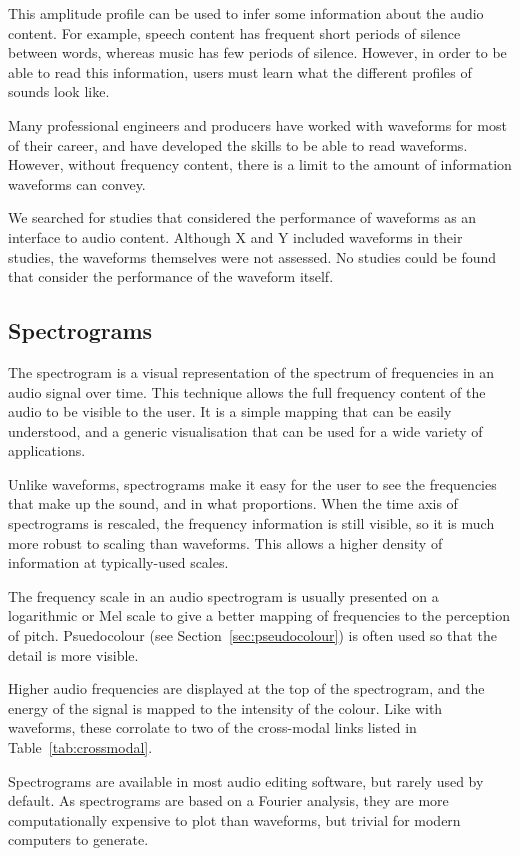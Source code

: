 This amplitude profile can be used to infer some information about the audio content. For example, speech content has
frequent short periods of silence between words, whereas music has few periods of silence. However, in order to be able
to read this information, users must learn what the different profiles of sounds look like.

Many professional engineers and producers have worked with waveforms for most of their career, and have developed the
skills to be able to read waveforms.  However, without frequency content, there is a limit to the amount of information
waveforms can convey.

We searched for studies that considered the performance of waveforms as an interface to audio content. Although X and Y
included waveforms in their studies, the waveforms themselves were not assessed. No studies could be found that
consider the performance of the waveform itself.

\subsection{Spectrograms}
The spectrogram is a visual representation of the spectrum of frequencies in an audio signal over time.  This technique
allows the full frequency content of the audio to be visible to the user. It is a simple mapping that can be easily
understood, and a generic visualisation that can be used for a wide variety of applications.

Unlike waveforms, spectrograms make it easy for the user to see the frequencies that make up the sound, and in what
proportions. When the time axis of spectrograms is rescaled, the frequency information is still visible, so it is much
more robust to scaling than waveforms. This allows a higher density of information at typically-used scales.

The frequency scale in an audio spectrogram is usually presented on a logarithmic or Mel scale to give a better mapping
of frequencies to the perception of pitch. Psuedocolour (see Section~\ref{sec:pseudocolour}) is often used so that the
detail is more visible.

Higher audio frequencies are displayed at the top of the spectrogram, and the energy of the signal is mapped to the
intensity of the colour. Like with waveforms, these corrolate to two of the cross-modal links listed in
Table~\ref{tab:crossmodal}.

Spectrograms are available in most audio editing software, but rarely used by default. As spectrograms are based on a
Fourier analysis, they are more computationally expensive to plot than waveforms, but trivial for modern computers to
generate.

